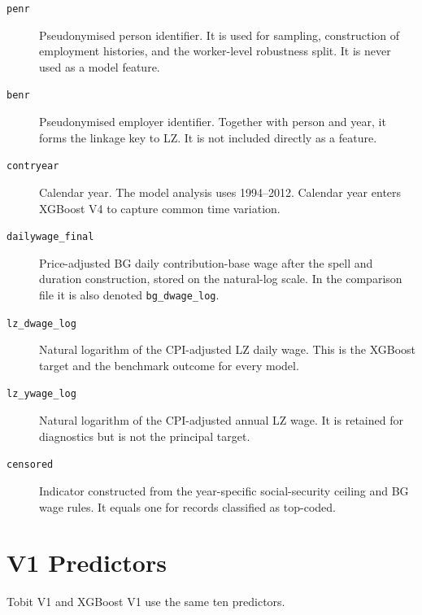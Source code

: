 \documentclass[12pt,a4paper,oneside,titlepage]{book}
\begin{document}
\begin{description}
  \item[\texttt{penr}] Pseudonymised person identifier. It is used for sampling, construction of employment histories, and the worker-level robustness split. It is never used as a model feature.
  \item[\texttt{benr}] Pseudonymised employer identifier. Together with person and year, it forms the linkage key to LZ. It is not included directly as a feature.
  \item[\texttt{contryear}] Calendar year. The model analysis uses 1994--2012. Calendar year enters XGBoost V4 to capture common time variation.
  \item[\texttt{dailywage\_final}] Price-adjusted BG daily contribution-base wage after the spell and duration construction, stored on the natural-log scale. In the comparison file it is also denoted \texttt{bg\_dwage\_log}.
  \item[\texttt{lz\_dwage\_log}] Natural logarithm of the CPI-adjusted LZ daily wage. This is the XGBoost target and the benchmark outcome for every model.
  \item[\texttt{lz\_ywage\_log}] Natural logarithm of the CPI-adjusted annual LZ wage. It is retained for diagnostics but is not the principal target.
  \item[\texttt{censored}] Indicator constructed from the year-specific social-security ceiling and BG wage rules. It equals one for records classified as top-coded.
\end{description}

\section{V1 Predictors}

Tobit V1 and XGBoost V1 use the same ten predictors.
\end{document}
